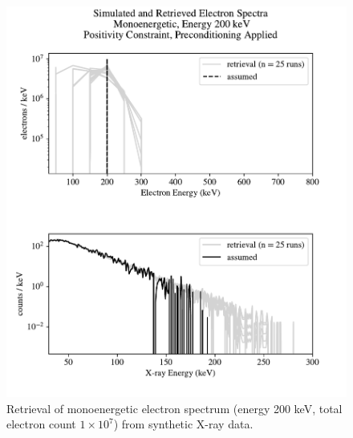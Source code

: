 \begin{figure}[p]
    \centering
    \includegraphics[width=\textwidth]{figures/chapter_4/synthetic_data_examples/mono_200keV_posonly_preconditioning_1e7_particles}
    \caption{Retrieval of monoenergetic electron spectrum (energy 200 keV, total electron count $1\times10^7$) from synthetic X-ray data.}
    \label{why_non_negative_is_good}
\end{figure}

